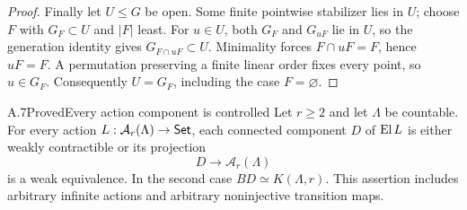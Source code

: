\begin{proof}
Finally let $U\leq G$ be open. Some finite pointwise stabilizer lies in $U$; choose $F$ with $G_F\subset U$ and $|F|$ least. For $u\in U$, both $G_F$ and $G_{uF}$ lie in $U$, so the generation identity gives $G_{F\cap uF}\subset U$. Minimality forces $F\cap uF=F$, hence $uF=F$. A permutation preserving a finite linear order fixes every point, so $u\in G_F$. Consequently $U=G_F$, including the case $F=\varnothing$.
\end{proof}

\begin{claim}{A.7}{Proved}{Every action component is controlled}\label{A:all-actions}
Let $r\geq2$ and let $\Lambda$ be countable. For every action $L:\mathcal A_r(\Lambda)\to\mathsf{Set}$, each connected component $D$ of $\operatorname{El} L$ is either weakly contractible or its projection
\[
 D\longrightarrow\mathcal A_r(\Lambda)
\]
is a weak equivalence. In the second case $BD\simeq K(\Lambda,r)$. This assertion includes arbitrary infinite actions and arbitrary noninjective transition maps.
\end{claim}
